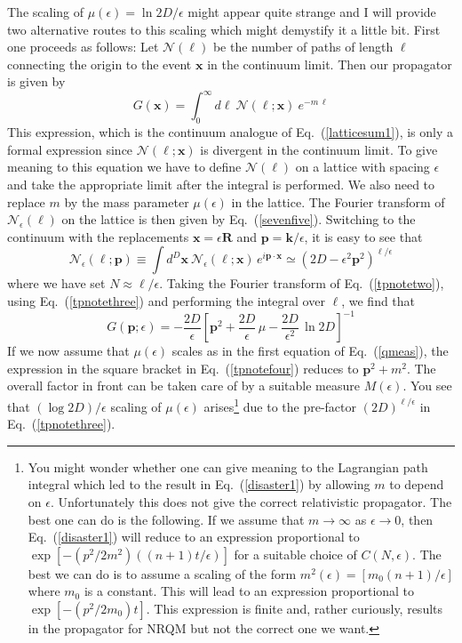 \documentclass{article}
\def\eq#1{{Eq.~(\ref{#1})}}
\begin{document}
The scaling of $\mu(\epsilon)=\ln 2D/\epsilon$ might appear quite strange and I will provide two alternative routes to this scaling which might demystify it a little bit. First one proceeds as follows:  Let $\mathcal{N}(\ell)$ be the number of paths of length $\ell$ connecting the origin to the event $\mathbf{x}$ in the continuum limit. Then our propagator is given by
\begin{equation}
 G(\mathbf{x}) = \int_0^\infty d\ell\ \mathcal{N}(\ell; \mathbf{x})\ e^{-m\, \ell}
 \label{tpnotetwo}
\end{equation}
This expression, which is the continuum analogue of \eq{latticesum1}, is only a formal expression since $\mathcal{N}(\ell; \mathbf{x})$ is divergent in the continuum limit. 
To give meaning to this equation we have to define $\mathcal{N}(\ell)$ on a lattice with spacing $\epsilon$ and take the appropriate limit after the integral is performed. We also need to replace $m$ by the mass parameter $\mu(\epsilon)$ in the lattice. The Fourier transform of 
$\mathcal{N}_\epsilon(\ell)$ on the lattice is then given by \eq{sevenfive}. 
Switching to the continuum with the replacements $\mathbf{x} = \epsilon \mathbf{R}$ and $\mathbf{p} = \mathbf{k}/\epsilon$, it is easy to see that
\begin{equation}
\mathcal{N}_\epsilon(\ell; \mathbf{p}) \equiv \int d^D\mathbf{x}\ \mathcal{N}_\epsilon(\ell; \mathbf{x}) \, e^{i\mathbf{p\cdot x}} \simeq (2D - \epsilon^2 \mathbf{p}^2)^{\ell/\epsilon}
 \label{tpnotethree}
\end{equation} 
where we have set $N\approx \ell/\epsilon$. Taking the Fourier transform of \eq{tpnotetwo},  using \eq{tpnotethree} and performing the integral over $\ell$, we find that
\begin{equation}
 G(\mathbf{p}; \epsilon) = -\frac{2D}{\epsilon} \left[ \mathbf{p}^2 + \frac{2D}{\epsilon} \, \mu -  \frac{2D}{\epsilon^2} \, \ln 2D\right]^{-1}
 \label{tpnotefour}
\end{equation} 
If we now assume that $\mu(\epsilon)$ scales as in the first equation of \eq{qmeas}, the expression in the square bracket in \eq{tpnotefour} reduces to $\mathbf{p}^2 + m^2$. The overall factor in front can be taken care of by a suitable measure $M(\epsilon)$. You see that $(\log 2D)/\epsilon$ scaling of $\mu(\epsilon)$ arises\footnote{You might wonder whether one can give meaning to the Lagrangian path integral which led to the result in \eq{disaster1} by allowing $m$ to depend on $\epsilon$. Unfortunately this does not give the correct relativistic propagator. The best one can do is the following. If we  assume that $m\to\infty$ as $\epsilon\to0$, then \eq{disaster1} will reduce  to an expression proportional to 
$
\exp[-(p^2/2m^2)((n+1)t/\epsilon)]$
for a suitable choice of $C(N,\epsilon)$. The best we can do is to assume a scaling of the form 
$
m^2(\epsilon) = [m_0(n+1)/\epsilon]
$ 
where $m_0$ is a constant. This will lead to an expression proportional to 
$\exp[-(p^2/2m_0)t]$.
This expression is finite and, rather curiously, results in the propagator for NRQM but not the correct one we want.} due to the pre-factor $(2D)^{\ell/\epsilon}$ in \eq{tpnotethree}.
\end{document}
